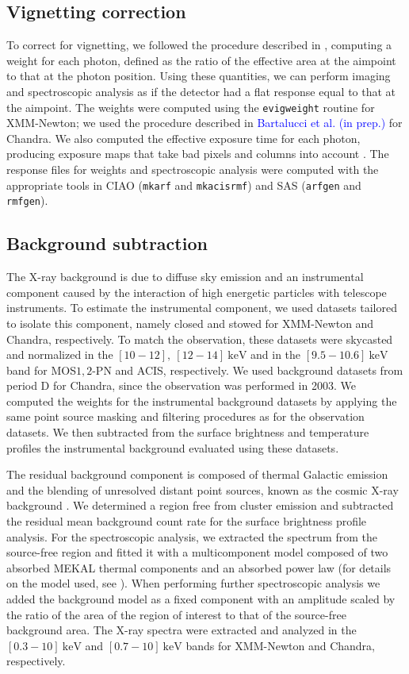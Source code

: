 \documentclass[traditabstract]{aa}
\begin{document}
\subsection{Vignetting correction}
To correct for vignetting, we followed the procedure described in \cite{arnaud2001}, computing a weight for each photon, defined as the ratio of the effective area at the aimpoint to that at the photon position. Using these quantities, we can perform imaging and spectroscopic analysis as if the detector had a flat response equal to that at the aimpoint.  The weights were computed using the \verb?evigweight? routine for XMM-Newton;  we used the procedure described in \textcolor{blue}{Bartalucci et al. (in prep.) }for Chandra.  We also computed the effective exposure time for each photon, producing exposure maps that take bad pixels and columns into account . The response files for weights and spectroscopic analysis were computed with the appropriate tools in CIAO (\verb?mkarf? and \verb?mkacisrmf?) and SAS (\verb?arfgen? and \verb?rmfgen?).

\subsection{Background subtraction}
The X-ray background is due to diffuse sky emission and an instrumental component caused by the interaction of high energetic particles with telescope instruments. To estimate the instrumental component, we used datasets tailored to isolate this component, namely {\sc closed} and {\sc stowed}  for XMM-Newton and Chandra, respectively. To match the observation, these datasets were  skycasted and normalized in the $[10-12], \ [12-14] \ \si{\kilo\electronvolt}$ and in the $[9.5-10.6] \ \si{\kilo\electronvolt}$ band for MOS$1,2$-PN and ACIS, respectively.  We used background datasets from period D for Chandra, since the observation was performed in 2003. We computed the weights for the instrumental background datasets by applying the same point source masking and filtering procedures as for the observation datasets. We then subtracted from the surface brightness and temperature profiles the instrumental background evaluated using these datasets.

The residual background component is composed of thermal Galactic emission \citep{snowden1995} and the blending of unresolved distant point sources, known as the cosmic X-ray background \citep{giacconi2001}.  We determined a region free from cluster emission and subtracted the residual mean background count rate for the surface
brightness profile analysis. For the spectroscopic analysis, we extracted the spectrum from the source-free region and fitted it with a multicomponent model composed of two absorbed {\sc MEKAL} thermal components and an absorbed power law (for details on the model used, see \citealt{pratt2009}). When performing further spectroscopic analysis we added the background model as a fixed component with an amplitude scaled by the ratio of the area of the region of interest to that of the source-free background area. The X-ray spectra were extracted and analyzed in the $[0.3-10] \ \si{\kilo\electronvolt}$ and $[0.7-10] \ \si{\kilo\electronvolt}$ bands for XMM-Newton and Chandra, respectively. 
\end{document}
